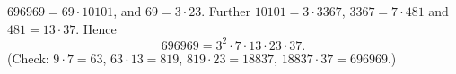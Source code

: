 $696969=69\cdot10101$, and $69=3\cdot23$. Further $10101=3\cdot3367$, $3367=7\cdot481$ and $481=13\cdot37$. Hence
\[696969=\boxed{3^2\cdot7\cdot13\cdot23\cdot37}.\]
(Check: $9\cdot7=63$, $63\cdot13=819$, $819\cdot23=18837$, $18837\cdot37=696969$.)
